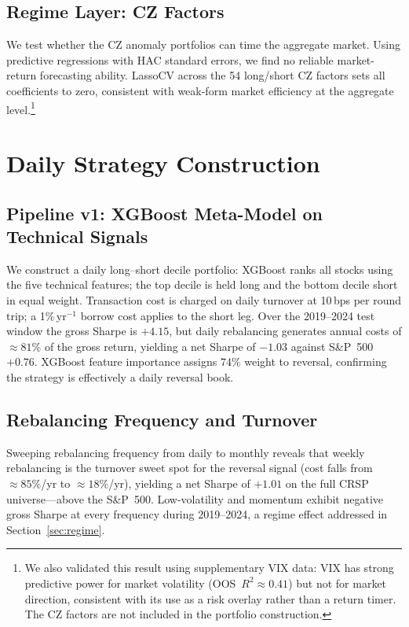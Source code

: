 \documentclass[11pt,a4paper]{article}
\begin{document}
\subsection{Regime Layer: CZ Factors}
\label{sec:regime-layer}

We test whether the CZ anomaly portfolios \citep{chen2022} can time the aggregate
market. Using predictive regressions with \citet{neweywest1987} HAC standard errors,
we find no reliable market-return forecasting ability. LassoCV across the 54 long/short
CZ factors sets all coefficients to zero, consistent with weak-form market
efficiency at the aggregate level.\footnote{We also validated this result using
supplementary VIX data: VIX has strong predictive power for market volatility
(OOS~$R^2\approx 0.41$) but not for market direction, consistent with its use
as a risk overlay rather than a return timer. The CZ factors are not included
in the portfolio construction.}

\section{Daily Strategy Construction}
\label{sec:strategy}

\subsection{Pipeline v1: XGBoost Meta-Model on Technical Signals}
\label{sec:pipeline}

We construct a daily long--short decile portfolio: XGBoost ranks all stocks
using the five technical features; the top decile is held long and the bottom
decile short in equal weight. Transaction cost is charged on daily turnover at
10\,bps per round trip; a 1\%\,yr$^{-1}$ borrow cost applies to the short leg.
Over the 2019--2024 test window the gross Sharpe is $+4.15$, but daily
rebalancing generates annual costs of $\approx 81\%$ of the gross return,
yielding a net Sharpe of $-1.03$ against S\&P~500~$+0.76$. XGBoost feature
importance assigns $74\%$ weight to reversal, confirming the strategy is
effectively a daily reversal book.

\subsection{Rebalancing Frequency and Turnover}
\label{sec:turnover}

Sweeping rebalancing frequency from daily to monthly reveals that weekly
rebalancing is the turnover sweet spot for the reversal signal (cost falls
from $\approx 85\%$/yr to $\approx 18\%$/yr), yielding a net Sharpe of
$+1.01$ on the full CRSP universe---above the S\&P~500. Low-volatility and
momentum exhibit negative gross Sharpe at every frequency during 2019--2024,
a regime effect addressed in Section~\ref{sec:regime}.
\end{document}
